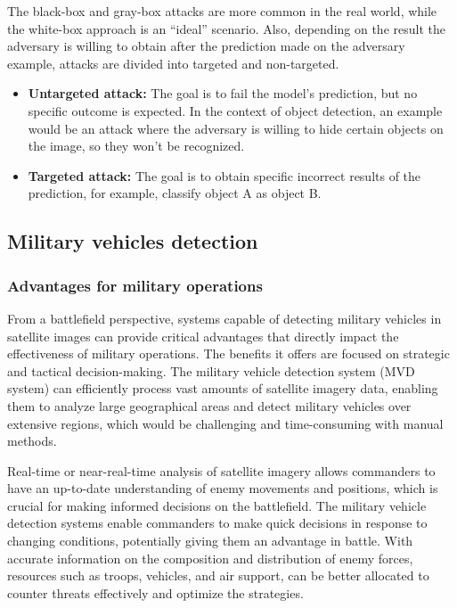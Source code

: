 \documentclass[14pt,a4paper]{extarticle}
\newcounter{e}
\numberwithin{equation}{section}
\numberwithin{figure}{section}
\begin{document}
The black-box and gray-box attacks are more common in the real world, while the white-box approach is an ``ideal'' scenario.
Also, depending on the result the adversary is willing to obtain after the prediction made on the adversary example, attacks are divided into targeted and non-targeted.

\begin{itemize}
    \item \textbf{Untargeted attack:} The goal is to fail the model’s prediction, but no specific outcome is expected. In the context of object detection, an example would be an attack where the adversary is willing to hide certain objects on the image, so they won’t be recognized.
    \item \textbf{Targeted attack:} The goal is to obtain specific incorrect results of the prediction, for example, classify object A as object B.
\end{itemize}



\subsection{Military vehicles detection}
\subsubsection{Advantages for military operations}
From a battlefield perspective, systems capable of detecting military vehicles in satellite images can provide critical advantages that directly impact the effectiveness of military operations. The benefits it offers are focused on strategic and tactical decision-making. The military vehicle detection system (MVD system) can efficiently process vast amounts of satellite imagery data, enabling them to analyze large geographical areas and detect military vehicles over extensive regions, which would be challenging and time-consuming with manual methods.

Real-time or near-real-time analysis of satellite imagery allows commanders to have an up-to-date understanding of enemy movements and positions, which is crucial for making informed decisions on the battlefield. The military vehicle detection systems enable commanders to make quick decisions in response to changing conditions, potentially giving them an advantage in battle. With accurate information on the composition and distribution of enemy forces, resources such as troops, vehicles, and air support, can be better allocated to counter threats effectively and optimize the strategies.
\end{document}
